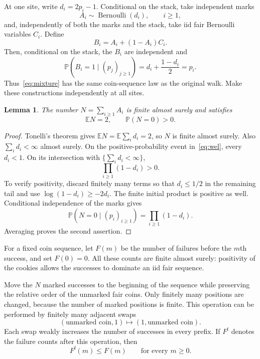 \documentclass[11pt]{amsart}
\numberwithin{equation}{section}
\newtheorem{lemma}[theorem]{Lemma}
\theoremstyle{remark}
\newcommand{\E}{\mathbb E}
\newcommand{\Pp}{\mathbb P}
\begin{document}
At one site, write $d_i=2p_i-1$. Conditional on the stack, take independent marks
\[
 A_i\sim\operatorname{Bernoulli}(d_i),\qquad i\ge1,
\]
and, independently of both the marks and the stack, take iid fair Bernoulli variables $C_i$. Define
\begin{equation}\label{eq:mixture}
 B_i=A_i+(1-A_i)C_i.
\end{equation}
Then, conditional on the stack, the $B_i$ are independent and
\[
 \Pp(B_i=1\mid(p_j)_{j\ge1})=d_i+\frac{1-d_i}{2}=p_i.
\]
Thus~\eqref{eq:mixture} has the same coin-sequence law as the original walk. Make these constructions independently at all sites.

\begin{lemma}\label{lem:marks}
The number $N=\sum_{i\ge1}A_i$ is finite almost surely and satisfies
\[
 \E N=2,\qquad\Pp(N=0)>0.
\]
\end{lemma}

\begin{proof}
Tonelli's theorem gives $\E N=\E\sum_i d_i=2$, so $N$ is finite almost surely. Also $\sum_i d_i<\infty$ almost surely. On the positive-probability event in~\eqref{eq:wel}, every $d_i<1$. On its intersection with $\{\sum_i d_i<\infty\}$,
\[
 \prod_{i\ge1}(1-d_i)>0.
\]
To verify positivity, discard finitely many terms so that $d_i\le1/2$ in the remaining tail and use $\log(1-d_i)\ge-2d_i$. The finite initial product is positive as well. Conditional independence of the marks gives
\[
 \Pp(N=0\mid(p_i)_{i\ge1})=\prod_{i\ge1}(1-d_i).
\]
Averaging proves the second assertion.
\end{proof}

For a fixed coin sequence, let $F(m)$ be the number of failures before the $m$th success, and set $F(0)=0$. All these counts are finite almost surely: positivity of the cookies allows the successes to dominate an iid fair sequence.

Move the $N$ marked successes to the beginning of the sequence while preserving the relative order of the unmarked fair coins. Only finitely many positions are changed, because the number of marked positions is finite. This operation can be performed by finitely many adjacent swaps
\[
 (\text{unmarked coin},1)\longmapsto(1,\text{unmarked coin}).
\]
Each swap weakly increases the number of successes in every prefix. If $F^{\mathrm f}$ denotes the failure counts after this operation, then
\begin{equation}\label{eq:frontload}
 F^{\mathrm f}(m)\le F(m)\qquad\text{for every }m\ge0.
\end{equation}
\end{document}
